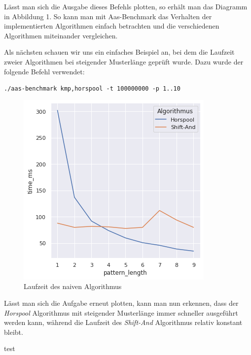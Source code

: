 \documentclass{article}
\begin{document}
\begin{multicols*}{2}
    Lässt man sich die Ausgabe dieses Befehls plotten, so erhält man das Diagramm in Abbildung 1. So kann man mit Aas-Benchmark das Verhalten der implementierten Algorithmen einfach betrachten und die verschiedenen Algorithmen miteinander vergleichen.

    Als nächsten schauen wir uns ein einfaches Beispiel an, bei dem die Laufzeit zweier Algorithmen bei steigender Musterlänge geprüft wurde. Dazu wurde der folgende Befehl verwendet:

    \texttt{./aas-benchmark kmp,horspool -t 100000000 -p 1..10}

    \begin{figure}
        \includegraphics[width=\linewidth]{assets/graph_2.png}
        \caption{Laufzeit des naiven Algorithmus}
    \end{figure}

    Lässt man sich die Aufgabe erneut plotten, kann man nun erkennen, dass der \textit{Horspool} Algorithmus mit steigender Musterlänge immer schneller ausgeführt werden kann, während die Laufzeit des \textit{Shift-And} Algorithmus relativ konstant bleibt.

\end{multicols*}



\begin{multicols*}{2}
    test
\end{multicols*}
\end{document}
